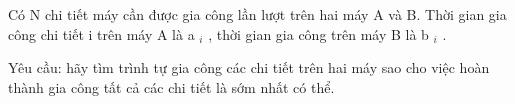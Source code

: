 Có N chi tiết máy cần được gia công lần lượt trên hai máy A và B. Thời gian gia công chi tiết i trên máy A là a   $_    i   $   , thời gian gia công trên máy B là b   $_    i   $   .  

   Yêu cầu: hãy tìm trình tự gia công các chi tiết trên hai máy sao cho việc hoàn thành gia công tất cả các chi tiết là sớm nhất có thể.